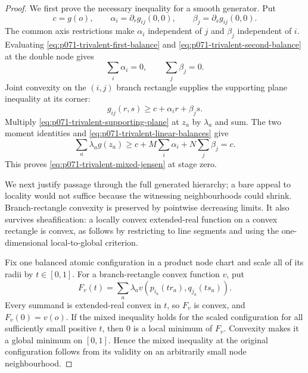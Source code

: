 \begin{proof}
We first prove the necessary inequality for a smooth generator.  Put
\[
 c=g(o),\qquad
 \alpha_i=\partial_rg_{ij}(0,0),\qquad
 \beta_j=\partial_sg_{ij}(0,0).
\]
The common axis restrictions make $\alpha_i$ independent of $j$ and
$\beta_j$ independent of $i$.  Evaluating
\eqref{eq:p071-trivalent-first-balance} and
\eqref{eq:p071-trivalent-second-balance} at the double node gives
\begin{equation}
                         \sum_i\alpha_i=0,
                  \qquad \sum_j\beta_j=0.
 \label{eq:p071-trivalent-linear-balances}
\end{equation}
Joint convexity on the $(i,j)$ branch rectangle supplies the supporting
plane inequality at its corner:
\begin{equation}
 g_{ij}(r,s)\geq c+\alpha_ir+\beta_js.
 \label{eq:p071-trivalent-supporting-plane}
\end{equation}
Multiply \eqref{eq:p071-trivalent-supporting-plane} at $z_a$ by
$\lambda_a$ and sum.  The two moment identities and
\eqref{eq:p071-trivalent-linear-balances} give
\[
 \sum_a\lambda_ag(z_a)
 \geq c
   +M\sum_i\alpha_i+N\sum_j\beta_j
 =c.
\]
This proves \eqref{eq:p071-trivalent-mixed-jensen} at stage zero.

We next justify passage through the full generated hierarchy; a bare appeal
to locality would not suffice because the witnessing neighbourhoods could
shrink.  Branch-rectangle convexity is preserved by pointwise decreasing
limits.  It also survives sheafification: a locally convex extended-real
function on a convex rectangle is convex, as follows by restricting to line
segments and using the one-dimensional local-to-global criterion.

Fix one balanced atomic configuration in a product node chart and scale all
of its radii by $t\in[0,1]$.  For a branch-rectangle convex function $v$, put
\begin{equation}
 F_v(t)=\sum_a\lambda_a
   v(p_{i_a}(tr_a),q_{j_a}(ts_a)).
 \label{eq:p071-trivalent-radial-propagation}
\end{equation}
Every summand is extended-real convex in $t$, so $F_v$ is convex, and
$F_v(0)=v(o)$.  If the mixed inequality holds for the scaled configuration
for all sufficiently small positive $t$, then $0$ is a local minimum of
$F_v$.  Convexity makes it a global minimum on $[0,1]$.  Hence the mixed
inequality at the original configuration follows from its validity on an
arbitrarily small node neighbourhood.


\end{proof}
